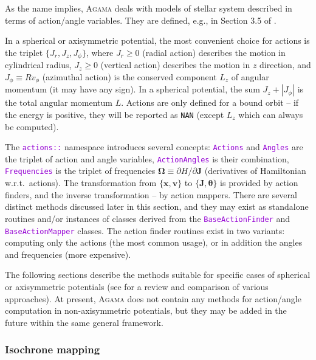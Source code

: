 \documentclass[12pt]{article}
\newcommand{\Agama}{\textsc{Agama}\xspace}
\newcommand{\ttt}[1]{\textcolor{darkviolet}{\texttt{#1}}}
\newcommand{\D}{\partial}
\newcommand{\bv}{\boldsymbol{v}}
\newcommand{\bx}{\boldsymbol{x}}
\newcommand{\bJ}{\boldsymbol{J}}
\newcommand{\bt}{\boldsymbol{\theta}}
\begin{document}
As the name implies, \Agama deals with models of stellar system described in terms of action/angle variables. They are defined, e.g., in Section 3.5 of \cite{BinneyTremaine}.

In a spherical or axisymmetric potential, the most convenient choice for actions is the triplet $\{J_r, J_z, J_\phi\}$, where $J_r\ge 0$ (radial action) describes the motion in cylindrical radius, $J_z\ge 0$ (vertical action) describes the motion in $z$ direction, and $J_\phi \equiv R v_\phi$ (azimuthal action) is the conserved component $L_z$ of angular momentum (it may have any sign). In a spherical potential, the sum $J_z + |J_\phi|$ is the total angular momentum $L$. Actions are only defined for a bound orbit -- if the energy is positive, they will be reported as \texttt{NAN} (except $L_z$ which can always be computed).

The \ttt{actions::} namespace introduces several concepts: \ttt{Actions} and \ttt{Angles} are the triplet of action and angle variables, \ttt{ActionAngles} is their combination, \ttt{Frequencies} is the triplet of frequencies $\boldsymbol{\Omega}\equiv \D H/\D \bJ$ (derivatives of Hamiltonian w.r.t.\ actions). 
The transformation from $\{\bx,\bv\}$ to $\{\bJ,\bt\}$ is provided by action finders, and the inverse transformation -- by action mappers. There are several distinct methods discussed later in this section, and they may exist as standalone routines and/or instances of classes derived from the \ttt{BaseActionFinder} and \ttt{BaseActionMapper} classes. The action finder routines exist in two variants: computing only the actions (the most common usage), or in addition the angles and frequencies (more expensive).

The following sections describe the methods suitable for specific cases of spherical or axisymmetric potentials (see \cite{SandersBinney2016} for a review and comparison of various approaches).
At present, \Agama does not contain any methods for action/angle computation in non\--axi\-sym\-met\-ric potentials, but they may be added in the future within the same general framework.


\subsubsection{Isochrone mapping}  \label{sec:ActionsIsochrone}
\end{document}
